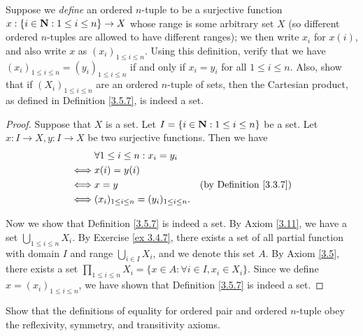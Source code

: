 \begin{exercise}\label{ex 3.5.2}
    Suppose we \emph{define} an ordered \(n\)-tuple to be a surjective function \(x : \{i \in \mathbf{N} : 1 \leq i \leq n\} \to X\) whose range is some arbitrary set \(X\) (so different ordered \(n\)-tuples are allowed to have different ranges);
    we then write \(x_i\) for \(x(i)\), and also write \(x\) as \((x_i)_{1 \leq i \leq n}\).
    Using this definition, verify that we have \((x_i)_{1 \leq i \leq n} = (y_i)_{1 \leq i \leq n}\) if and only if \(x_i = y_i\) for all \(1 \leq i \leq n\).
    Also, show that if \((X_i)_{1 \leq i \leq n}\) are an ordered \(n\)-tuple of sets, then the Cartesian product, as defined in Definition \ref{3.5.7}, is indeed a set.
\end{exercise}

\begin{proof}
    Suppose that \(X\) is a set.
    Let \(I = \{i \in \mathbf{N} : 1 \leq i \leq n\}\) be a set.
    Let \(x : I \to X, y : I \to X\) be two surjective functions.
    Then we have
    \begin{align*}
             & \forall 1 \leq i \leq n : x_i = y_i                                                     \\
        \iff & x(i) = y(i)                                                                             \\
        \iff & x = y                                              & \text{(by Definition \ref{3.3.7})} \\
        \iff & (x_i)_{1 \leq i \leq n} = (y_i)_{1 \leq i \leq n}.
    \end{align*}

    Now we show that Definition \ref{3.5.7} is indeed a set.
    By Axiom \ref{3.11}, we have a set \(\bigcup_{1 \leq i \leq n} X_i\).
    By Exercise \ref{ex 3.4.7}, there exists a set of all partial function with domain \(I\) and range \(\bigcup_{i \in I} X_i\), and we denote this set \(A\).
    By Axiom \ref{3.5}, there exists a set \(\prod_{1 \leq i \leq n} X_i = \{x \in A : \forall i \in I, x_i \in X_i\}\).
    Since we define \(x = (x_i)_{1 \leq i \leq n}\), we have shown that Definition \ref{3.5.7} is indeed a set.
\end{proof}

\begin{exercise}\label{ex 3.5.3}
    Show that the definitions of equality for ordered pair and ordered \(n\)-tuple obey the reflexivity, symmetry, and transitivity axioms.
\end{exercise}

